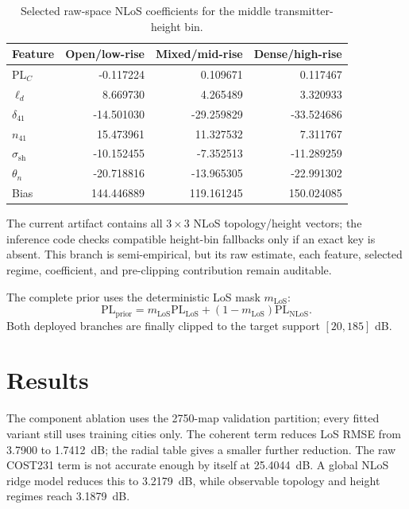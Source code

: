 \documentclass[10pt,conference]{IEEEtran}
\begin{document}
\begin{table}[t]
\centering
\caption{Selected raw-space NLoS coefficients for the middle
transmitter-height bin.}
\label{tab:nlos-coefficients}
\scriptsize
\setlength{\tabcolsep}{3.3pt}
\begin{tabular}{lrrr}
\toprule
Feature & Open/low-rise & Mixed/mid-rise & Dense/high-rise \\
\midrule
$\mathrm{PL}_{C}$ & -0.117224 & 0.109671 & 0.117467 \\
$\ell_d$ & 8.669730 & 4.265489 & 3.320933 \\
$\delta_{41}$ & -14.501030 & -29.259829 & -33.524686 \\
$n_{41}$ & 15.473961 & 11.327532 & 7.311767 \\
$\sigma_{\mathrm{sh}}$ & -10.152455 & -7.352513 & -11.289259 \\
$\theta_n$ & -20.718816 & -13.965305 & -22.991302 \\
Bias & 144.446889 & 119.161245 & 150.024085 \\
\bottomrule
\end{tabular}
\end{table}

The current artifact contains all $3\times3$ NLoS topology/height vectors;
the inference code checks compatible height-bin fallbacks only if an exact key
is absent. This branch is semi-empirical, but its raw estimate, each feature,
selected regime, coefficient, and pre-clipping contribution remain auditable.

The complete prior uses the deterministic LoS mask $m_{\mathrm{LoS}}$:
\begin{equation}
\mathrm{PL}_{\mathrm{prior}}=m_{\mathrm{LoS}}\mathrm{PL}_{\mathrm{LoS}}
+(1-m_{\mathrm{LoS}})\mathrm{PL}_{\mathrm{NLoS}}.
\label{eq:combined}
\end{equation}
Both deployed branches are finally clipped to the target support
$[20,185]$ dB.

\section{Results}
\label{sec:results}

The component ablation uses the 2750-map validation partition; every fitted
variant still uses training cities only.
The coherent term reduces LoS RMSE from 3.7900 to \SI{1.7412}{dB}; the radial
table gives a smaller further reduction. The raw COST231 term is not accurate
enough by itself at \SI{25.4044}{dB}. A global NLoS ridge model reduces this to
\SI{3.2179}{dB}, while observable topology and height regimes reach
\SI{3.1879}{dB}.
\end{document}
